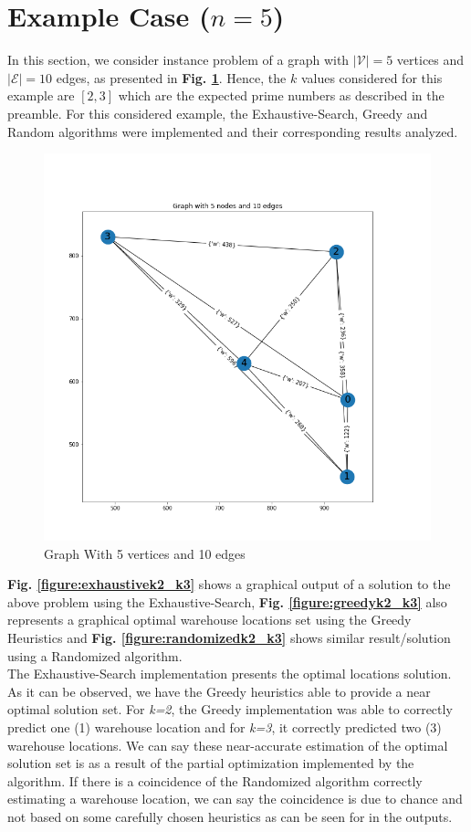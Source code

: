 \documentclass[longpaper, english, final, times]{revdetua}
\begin{document}
	\section{\label{outline:example-case} Example Case ($n=5$)}
		In this section, we consider instance problem of a graph with $|\mathcal{V}|=5$ vertices and $|\mathcal{E}|=10$ edges, as presented in \textbf{Fig. \ref{figure:n5}}. Hence, the $k$ values considered for this example are $[2,3]$ which are the expected prime numbers as described in the preamble. For this considered example, the Exhaustive-Search, Greedy and Random algorithms were implemented and their corresponding results analyzed.
		\begin{figure}[!h]
			\includegraphics[width=\linewidth, height=0.8\linewidth]{imgs/n5.png}
			\caption{Graph With 5 vertices and 10 edges}
			\label{figure:n5}
		\end{figure}
	
		\textbf{Fig. \ref{figure:exhaustivek2_k3}} shows a graphical output of a solution to the above problem using the Exhaustive-Search, \textbf{Fig. \ref{figure:greedyk2_k3}} also represents a graphical optimal warehouse locations set using the Greedy Heuristics and \textbf{Fig. \ref{figure:randomizedk2_k3}} shows similar result/solution using a Randomized algorithm.\\
		
		The Exhaustive-Search implementation presents the optimal locations solution. As it can be observed, we have the Greedy heuristics able to provide a near optimal solution set. For \emph{k=2}, the Greedy implementation was able to correctly predict one (1) warehouse location and for \emph{k=3}, it correctly predicted two (3) warehouse locations. We can say these near-accurate estimation of the optimal solution set is as a result of the partial optimization implemented by the algorithm. If there is a coincidence of the Randomized algorithm correctly estimating a warehouse location, we can say the coincidence is due to chance and not based on some carefully chosen heuristics as can be seen for in the outputs.\\
		
\end{document}
